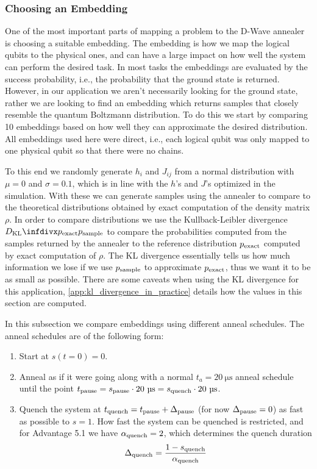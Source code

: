 \subsubsection{Choosing an Embedding}
One of the most important parts of mapping a problem to the D-Wave annealer is choosing a suitable embedding.
The embedding is how we map the logical qubits to the physical ones, and can have a large impact on how well the system can perform the desired task.
In most tasks the embeddings are evaluated by the success probability, i.e., the probability that the ground state is returned.
However, in our application we aren't necessarily looking for the ground state, rather we are looking to find an embedding which returns samples that closely resemble the quantum Boltzmann distribution.
To do this we start by comparing 10 embeddings based on how well they can approximate the desired distribution.
All embeddings used here were direct, i.e., each logical qubit was only mapped to one physical qubit so that there were no chains.

To this end we randomly generate \( h_i \) and \( J_{ij} \) from a normal distribution with \( \mu = 0 \) and \( \sigma = 0.1 \), which is in line with the \( h \)'s and \( J \)'s optimized in the simulation.
With these we can generate samples using the annealer to compare to the theoretical distributions obtained by exact computation of the density matrix \( \rho \).
In order to compare distributions we use the Kullback-Leibler divergence \( \DKL{\pexact}{\psample} \) to compare the probabilities computed from the samples returned by the annealer to the reference distribution \( p_{\text{exact}} \) computed by exact computation of \( \rho \).
The KL divergence essentially tells us how much information we lose if we use \( p_{\text{sample}} \) to approximate \( p_{\text{exact}} \), thus we want it to be as small as possible.
There are some caveats when using the KL divergence for this application, \cref{app:kl_divergence_in_practice} details how the values in this section are computed.

In this subsection we compare embeddings using different anneal schedules.
The anneal schedules are of the following form:
\begin{enumerate}
    \item Start at \( s(t = 0) = 0 \).
    \item Anneal as if it were going along with a normal \( t_a = 20 \ \si{\micro\second} \) anneal schedule until the point \( \tpause = \spause \cdot 20 \ \si{\micro\second} = \squench \cdot 20 \ \si{\micro\second} \).
    \item Quench the system at \( t_{\text{quench}} = t_{\text{pause}} + \Delta_{\text{pause}} \) (for now \( \Delta_{\text{pause}} = 0 \)) as fast as possible to \( s = 1 \).
        How fast the system can be quenched is restricted, and for Advantage 5.1 we have \( \alpha_{\text{quench}} = 2 \), which determines the quench duration
        \[
            \Delta_{\text{quench}} = \frac{1 - s_{\text{quench}}}{\alpha_{\text{quench}}}
        \]
\end{enumerate}

